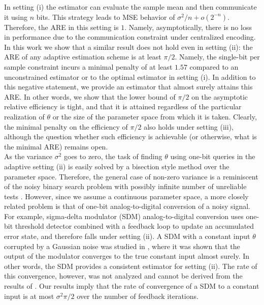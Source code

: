 \documentclass[letterpaper, conference]{IEEEtran}      %
\begin{document}
In setting (i) the estimator can evaluate the sample mean and then communicate it using $n$ bits. This strategy leads to MSE behavior of $\sigma^2/n + o(2^{-n})$. Therefore, the ARE in this setting is $1$. Namely, asymptotically, there is no loss in performance due to the communication constraint under centralized encoding. In this work we show that a similar result does not hold even in setting (ii): the ARE of any adaptive estimation scheme is at least $\pi/2$. Namely, the single-bit per sample constraint incurs a minimal penalty of at least $1.57$ compared to an unconstrained estimator or to the optimal estimator in setting (i). In addition to this negative statement, we provide an estimator that almost surely attains this ARE. In other words, we show that the lower bound of $\pi/2$ on the asymptotic relative efficiency is tight, and that it is attained regardless of the particular realization of $\theta$ or the size of the parameter space from which it is taken. Clearly, the minimal penalty on the efficiency of $\pi/2$ also holds under setting (iii), although the question whether such efficiency is achievable (or otherwise, what is the minimal ARE) remains open.  \\

As the variance $\sigma^2$ goes to zero, the task of finding $\theta$ using one-bit queries in the adaptive setting (ii) is easily solved by a bisection style method over the parameter space. Therefore, the general case of non-zero variance is a reminiscent of the noisy binary search problem with possibly infinite number of unreliable tests \cite{cicalese2002least, Karp:2007:NBS:1283383.1283478}. However, since we assume a continuous parameter space, a more closely related problem is that of one-bit analog-to-digital conversion of a noisy signal. For example, sigma-delta modulator (SDM) analog-to-digital conversion \cite{1092194} uses one-bit threshold detector combined with a feedback loop to update an accumulated error state, and therefore falls under setting (ii). A SDM with a constant input $\theta$ corrupted by a Gaussian noise was studied in \cite{53738}, where it was shown that the output of the modulator converges to the true constant input almost surely. In other words, the SDM provides a consistent estimator for setting (ii). The rate of this convergence, however, was not analyzed and cannot be derived from the results of \cite{53738}. Our results imply that the rate of convergence of a SDM to a constant input is at most $\sigma^2\pi/2$ over the number of feedback iterations. \\
\end{document}
